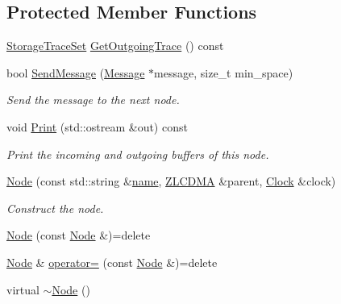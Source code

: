 \subsection*{Protected Member Functions}
\begin{DoxyCompactItemize}
\item 
\hyperlink{class_simulator_1_1_storage_trace_set}{Storage\+Trace\+Set} \hyperlink{class_simulator_1_1_z_l_c_d_m_a_1_1_node_a33ef1d732bbf78b8410480d910379d6e}{Get\+Outgoing\+Trace} () const 
\item 
bool \hyperlink{class_simulator_1_1_z_l_c_d_m_a_1_1_node_a60f03c2ab0b687c9b1be3e65ef69c02a}{Send\+Message} (\hyperlink{union_simulator_1_1_z_l_c_d_m_a_1_1_node_1_1_message}{Message} $\ast$message, size\+\_\+t min\+\_\+space)
\begin{DoxyCompactList}\small\item\em Send the message to the next node. \end{DoxyCompactList}\item 
void \hyperlink{class_simulator_1_1_z_l_c_d_m_a_1_1_node_a5d6616251c752f42f6318d9f071fe65d}{Print} (std\+::ostream \&out) const 
\begin{DoxyCompactList}\small\item\em Print the incoming and outgoing buffers of this node. \end{DoxyCompactList}\item 
\hyperlink{class_simulator_1_1_z_l_c_d_m_a_1_1_node_a298de98db685ed695b7e7eca9da3fd61}{Node} (const std\+::string \&\hyperlink{mtconf_8c_a8f8f80d37794cde9472343e4487ba3eb}{name}, \hyperlink{class_simulator_1_1_z_l_c_d_m_a}{Z\+L\+C\+D\+M\+A} \&parent, \hyperlink{class_simulator_1_1_clock}{Clock} \&clock)
\begin{DoxyCompactList}\small\item\em Construct the node. \end{DoxyCompactList}\item 
\hyperlink{class_simulator_1_1_z_l_c_d_m_a_1_1_node_a399829f355a8abb46a903239d07abc01}{Node} (const \hyperlink{class_simulator_1_1_z_l_c_d_m_a_1_1_node}{Node} \&)=delete
\item 
\hyperlink{class_simulator_1_1_z_l_c_d_m_a_1_1_node}{Node} \& \hyperlink{class_simulator_1_1_z_l_c_d_m_a_1_1_node_a02e69a22860f0433ea0959c59676f2df}{operator=} (const \hyperlink{class_simulator_1_1_z_l_c_d_m_a_1_1_node}{Node} \&)=delete
\item 
virtual \hyperlink{class_simulator_1_1_z_l_c_d_m_a_1_1_node_a3f5dc89d10434d13995252582adf0e6a}{$\sim$\+Node} ()
\end{DoxyCompactItemize}
